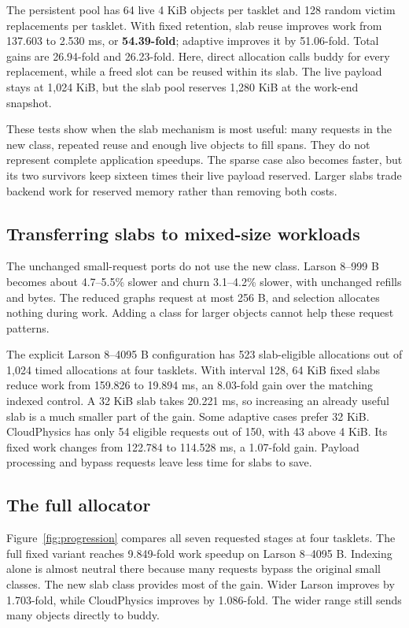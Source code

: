 \documentclass[conference]{IEEEtran}
\begin{document}
The persistent pool has 64 live 4 KiB objects per tasklet and 128 random victim replacements per tasklet. With fixed retention, slab reuse improves work from 137.603 to 2.530 ms, or \textbf{54.39-fold}; adaptive improves it by 51.06-fold. Total gains are 26.94-fold and 26.23-fold. Here, direct allocation calls buddy for every replacement, while a freed slot can be reused within its slab. The live payload stays at 1,024 KiB, but the slab pool reserves 1,280 KiB at the work-end snapshot.

These tests show when the slab mechanism is most useful: many requests in the new class, repeated reuse and enough live objects to fill spans. They do not represent complete application speedups. The sparse case also becomes faster, but its two survivors keep sixteen times their live payload reserved. Larger slabs trade backend work for reserved memory rather than removing both costs.

\subsection{Transferring slabs to mixed-size workloads}

The unchanged small-request ports do not use the new class. Larson 8--999 B becomes about 4.7--5.5\% slower and churn 3.1--4.2\% slower, with unchanged refills and bytes. The reduced graphs request at most 256 B, and selection allocates nothing during work. Adding a class for larger objects cannot help these request patterns.

The explicit Larson 8--4095 B configuration has 523 slab-eligible allocations out of 1,024 timed allocations at four tasklets. With interval 128, 64 KiB fixed slabs reduce work from 159.826 to 19.894 ms, an 8.03-fold gain over the matching indexed control. A 32 KiB slab takes 20.221 ms, so increasing an already useful slab is a much smaller part of the gain. Some adaptive cases prefer 32 KiB. CloudPhysics has only 54 eligible requests out of 150, with 43 above 4 KiB. Its fixed work changes from 122.784 to 114.528 ms, a 1.07-fold gain. Payload processing and bypass requests leave less time for slabs to save.

\subsection{The full allocator}

Figure~\ref{fig:progression} compares all seven requested stages at four tasklets. The full fixed variant reaches 9.849-fold work speedup on Larson 8--4095 B. Indexing alone is almost neutral there because many requests bypass the original small classes. The new slab class provides most of the gain. Wider Larson improves by 1.703-fold, while CloudPhysics improves by 1.086-fold. The wider range still sends many objects directly to buddy.
\end{document}
